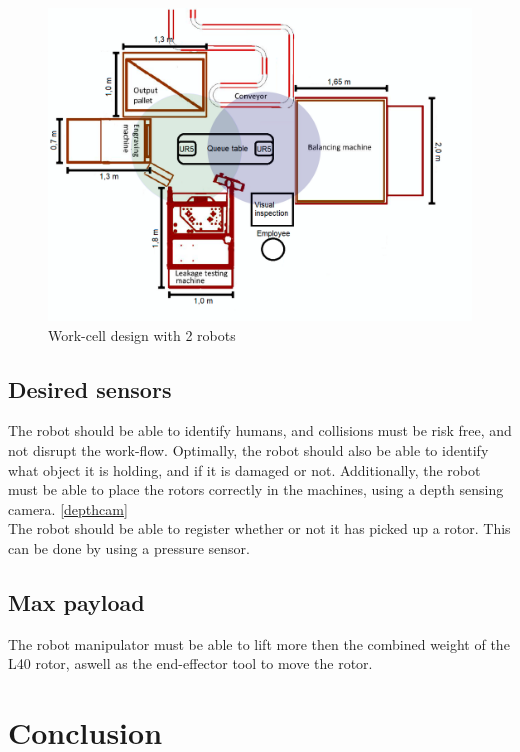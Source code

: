 \begin{figure}[H]
    \centering
    \includegraphics[width=.5\textwidth]{Design/Work_cell_8.PNG}
    \caption{Work-cell design with 2 robots}
    \label{fig:workscell2arms}
\end{figure}




\subsection{Desired sensors}

The robot should be able to identify humans, and collisions must be risk free, and not disrupt the work-flow. Optimally, the robot should also be able to identify what object it is holding, and if it is damaged or not. Additionally, the robot must be able to place the rotors correctly in the machines, using a depth sensing camera. \ref{depthcam}\\
The robot should be able to register whether or not it has picked up a rotor. This can be done by using a pressure sensor.\\ 

\subsection{Max payload}
The robot manipulator must be able to lift more then  the combined weight of the L40 rotor, aswell as the end-effector tool to move the rotor.\\



\section{Conclusion} 

